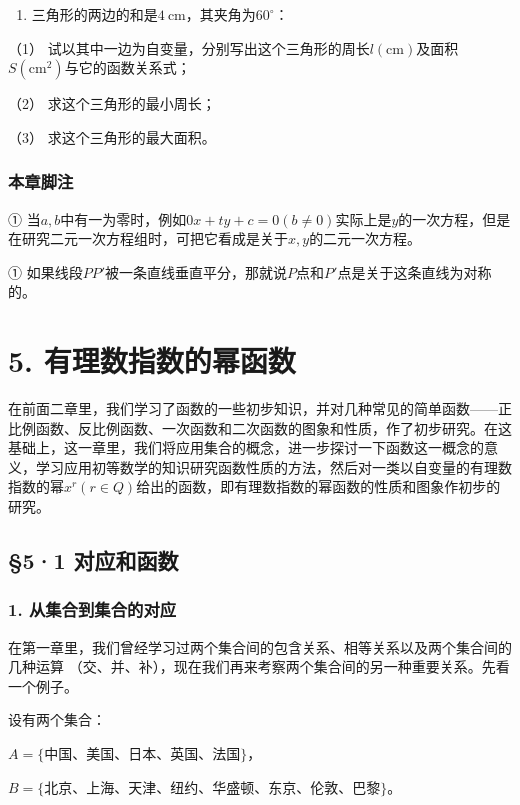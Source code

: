 \begin{enumerate}[start=6]
\item
  三角形的两边的和是\(4 \mathrm{~cm}\)，其夹角为\(60^{\circ}\)：
\end{enumerate}

（1）
试以其中一边为自变量，分别写出这个三角形的周长\(l(\mathrm{cm})\)及面积\(S(\mathrm{cm}^2)\)与它的函数关系式；

（2） 求这个三角形的最小周长；

（3） 求这个三角形的最大面积。

\subsection{本章脚注}

①
当\(a, b\)中有一为零时，例如\(0x + ty + c = 0 (b \neq 0)\)实际上是\(y\)的一次方程，但是在研究二元一次方程组时，可把它看成是关于\(x, y\)的二元一次方程。

①
如果线段\(PP'\)被一条直线垂直平分，那就说\(P\)点和\(P'\)点是关于这条直线为对称的。

\chapter{5. 有理数指数的幂函数}

在前面二章里，我们学习了函数的一些初步知识，并对几种常见的简单函数------正比例函数、反比例函数、一次函数和二次函数的图象和性质，作了初步研究。在这基础上，这一章里，我们将应用集合的概念，进一步探讨一下函数这一概念的意义，学习应用初等数学的知识研究函数性质的方法，然后对一类以自变量的有理数指数的幂\(x^{r} (r \in Q)\)给出的函数，即有理数指数的幂函数的性质和图象作初步的研究。

\section{§5·1 对应和函数}

\subsection{1. 从集合到集合的对应}

在第一章里，我们曾经学习过两个集合间的包含关系、相等关系以及两个集合间的几种运算
（交、并、补），现在我们再来考察两个集合间的另一种重要关系。先看一个例子。

设有两个集合：

\(A=\{\text{中国、美国、日本、英国、法国}\}\)，

\(B=\{\text{北京、上海、天津、纽约、华盛顿、东京、伦敦、巴黎}\}\)。

